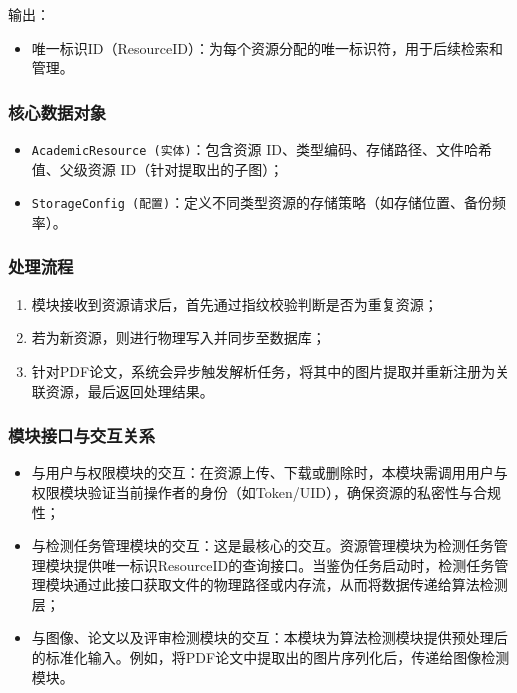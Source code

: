 输出：
\begin{itemize}[leftmargin=2em]
    \item 唯一标识ID（ResourceID）：为每个资源分配的唯一标识符，用于后续检索和管理。
\end{itemize}

\subsubsection{核心数据对象}
\begin{itemize}[leftmargin=2em]
    \item \texttt{AcademicResource (实体)}：包含资源 ID、类型编码、存储路径、文件哈希值、父级资源 ID（针对提取出的子图）；
    \item \texttt{StorageConfig (配置)}：定义不同类型资源的存储策略（如存储位置、备份频率）。
\end{itemize}

\subsubsection{处理流程}
\begin{enumerate}[leftmargin=2em]
    \item 模块接收到资源请求后，首先通过指纹校验判断是否为重复资源；
    \item 若为新资源，则进行物理写入并同步至数据库；
    \item 针对PDF论文，系统会异步触发解析任务，将其中的图片提取并重新注册为关联资源，最后返回处理结果。
\end{enumerate}

\subsubsection{模块接口与交互关系}
\begin{itemize}[leftmargin=2em]
    \item 与用户与权限模块的交互：在资源上传、下载或删除时，本模块需调用用户与权限模块验证当前操作者的身份（如Token/UID），确保资源的私密性与合规性；
    \item 与检测任务管理模块的交互：这是最核心的交互。资源管理模块为检测任务管理模块提供唯一标识ResourceID的查询接口。当鉴伪任务启动时，检测任务管理模块通过此接口获取文件的物理路径或内存流，从而将数据传递给算法检测层；
    \item 与图像、论文以及评审检测模块的交互：本模块为算法检测模块提供预处理后的标准化输入。例如，将PDF论文中提取出的图片序列化后，传递给图像检测模块。
\end{itemize}

